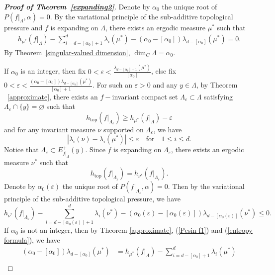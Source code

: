 \documentclass[11pt,a4paper]{amsart}
\theoremstyle{plain}
\theoremstyle{remark}
\begin{document}
	\begin{proof}[\textbf{Proof of Theorem~\ref{expanding2}}]
		Denote by $\alpha_{0}$ the unique root of $P(f|_{\Lambda},\alpha)=0$. By the variational principle of the sub-additive topological pressure and $f$ is expanding on $\Lambda$, there exists an ergodic measure $\mu^{\ast}$ such that
		\begin{align}\label{Pesin f1}
			h_{\mu^{\ast}}(f|_{\Lambda})-\sum^{d}_{i=d-[\alpha_{0}]+1}\lambda_{i}(\mu^{\ast})-(\alpha_{0}-[\alpha_{0}])\lambda_{d-[\alpha_{0}]}(\mu^{\ast})=0.
		\end{align}
		By Theorem~\ref{singular-valued dimension}, $\dim_{C} \Lambda=\alpha_{0}$.
		
		If $\alpha_{0}$ is an integer, then fix $0<\varepsilon<\frac{\lambda_{d-[\alpha_{0}]+1}(\mu^{\ast})}{[\alpha_{0}]}$, else fix $0<\varepsilon< \frac{(\alpha_{0}-[\alpha_{0}])\lambda_{d-[\alpha_{0}]}(\mu^{\ast})}{[\alpha_{0}]+1}$.
		For such an  $\varepsilon>0$ and any $y\in \Lambda$, by Theorem ~\ref{approximate}, there exists an $f-$invariant compact set $\Lambda_{\varepsilon}\subset \Lambda$ satisfying $\Lambda_{\varepsilon}\cap \{y\}=\varnothing$ such that $$h_{\text{top}}(f|_{\Lambda_{\varepsilon}})\geq h_{\mu^{\ast}}(f|_{\Lambda})-\varepsilon$$ and for any invariant measure $\nu$ supported on $\Lambda_{\varepsilon}$, we have $$|\lambda_{i}(\nu)-\lambda_{i}(\mu^{\ast})|\leq \varepsilon \quad \text{for} \quad 1\leq i\leq d.$$ Notice that $\Lambda_{\varepsilon}\subset E^{+}_{f|_{\Lambda}}(y)$. Since $f$ is expanding on $\Lambda_{\varepsilon}$, there exists an ergodic measure $\nu^{\ast}$ such that $$h_{\text{top}}(f|_{\Lambda_{\varepsilon}})=h_{\nu^{\ast}}(f|_{\Lambda_{\varepsilon}}).$$ Denote by $\alpha_{0}(\varepsilon)$ the unique root of $P(f|_{\Lambda_{\varepsilon}},\alpha)=0$.
		Then by the variational principle of the sub-additive topological pressure, we have
		\begin{equation}\label{entropy formula}
			h_{\nu^{\ast}}(f|_{\Lambda_{\varepsilon}})-\sum^{d}_{i=d-[\alpha_{0}(\varepsilon)]+1}\lambda_{i}(\nu^{\ast})-(\alpha_{0}(\varepsilon)-[\alpha_{0}(\varepsilon)])\lambda_{d-[\alpha_{0}(\varepsilon)]}(\nu^{\ast})\leq 0.
		\end{equation}
		If $\alpha_{0}$ is not an integer, then by Theorem \ref{approximate}, (\ref{Pesin f1}) and (\ref{entropy formula}), we have
		\begin{align*}
			(\alpha_{0}-[\alpha_{0}])\lambda_{d-[\alpha_{0}]}(\mu^{\ast})&=h_{\mu^{\ast}}(f|_{\Lambda})-\sum^{d}_{i=d-[\alpha_{0}]+1}\lambda_{i}(\mu^{\ast})\\

\end{align*}
\end{proof}
\end{document}
